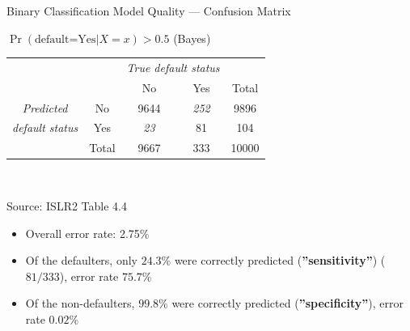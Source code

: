 \documentclass[ignorenonframetext,xcolor=x11names]{beamer}
\begin{document}
\begin{frame}{Binary Classification Model Quality --- Confusion Matrix}

\begin{block}{}
\begin{center}
\renewcommand{\arraystretch}{1.25}

$\Pr(\text{default=Yes} | X=x) > 0.5$ (Bayes) \\ \vspace{2mm}
\begin{tabular}{cc|cc|c} \hline
     & & \multicolumn{2}{c|}{\emph{True default status}} \\
     & & No & Yes & Total \\ \hline
\emph{Predicted} & No & 9644 & \emph{252} & 9896 \\ 
\emph{default status} & Yes & \emph{23} & 81 & 104 \\ \hline
     & Total & 9667 & 333 & 10000 \\ \hline
\end{tabular} \\
\end{center}
\scriptsize Source: ISLR2 Table 4.4
\end{block}

\begin{itemize}
  \item Overall error rate: 2.75\%
  \item Of the defaulters, only $24.3\%$ were correctly predicted (\textbf{''sensitivity''}) ($81/333$), error rate $75.7\%$
  \item Of the non-defaulters, $99.8\%$ were correctly predicted (\textbf{''specificity''}), error rate $0.02\%$
\end{itemize}
\end{frame}
\end{document}

